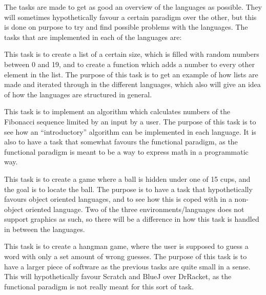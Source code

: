 The tasks are made to get as good an overview of the languages as possible. They will sometimes hypothetically favour a certain paradigm over the other, but this is done on purpose to try and find possible problems with the languages. The tasks that are implemented in each of the languages are:
\begin{description}[style=nextline]
\item[Task 1: Iterator] This task is to create a list of a certain size, which is filled with random numbers between 0 and 19, and to create a function which adds a number to every other element in the list. The purpose of this task is to get an example of how lists are made and iterated through in the different languages, which also will give an idea of how the languages are structured in general.
\item[Task 2: Fibonacci Sequence] This task is to implement an algorithm which calculates numbers of the Fibonacci sequence limited by an input by a user. The purpose of this task is to see how an ``introductory'' algorithm can be implemented in each language. It is also to have a task that somewhat favours the functional paradigm, as the functional paradigm is meant to be a way to express math in a programmatic way.
\item[Task 3: Cups and Ball] This task is to create a game where a ball is hidden under one of 15 cups, and the goal is to locate the ball. The purpose is to have a task that hypothetically favours object oriented languages, and to see how this is coped with in a non-object oriented language. Two of the three environments/languages does not support graphics as such, so there will be a difference in how this task is handled in between the languages.
\item[Task 4: Hangman] This task is to create a hangman game, where the user is supposed to guess a word with only a set amount of wrong guesses. The purpose of this task is to have a larger piece of software as the previous tasks are quite small in a sense. This will hypothetically favour Scratch and BlueJ over DrRacket, as the functional paradigm is not really meant for this sort of task.
\end{description}


